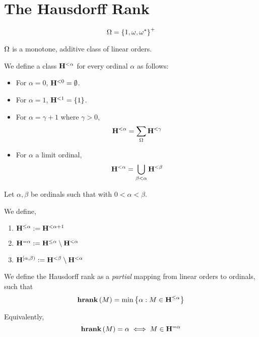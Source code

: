 \section{The Hausdorff Rank}

\begin{definition}
  \[
    \Omega = \left\{ {1, \omega, \omega^\ast} \right\}^+
  \]
\end{definition}

\begin{observation}
  $\Omega$ is a monotone, additive class of linear orders.
\end{observation}

\begin{definition}
  We define a class $\mathbf{H}^{< \alpha}$
  for every ordinal $\alpha$ as follows:

  \begin{itemize}
    \item For $\alpha = 0$, $\mathbf{H}^{< 0} = \emptyset$.
    \item For $\alpha = 1$, $\mathbf{H}^{< 1} = \left\{ {1} \right\}$.
    \item For $\alpha = \gamma + 1$ where $\gamma > 0$,
          \[\mathbf{H}^{< \alpha} = \sum_{\Omega}{\mathbf{H}^{< \gamma}}\]
    \item For $\alpha$ a limit ordinal,
          \[\mathbf{H}^{< \alpha} = \bigcup_{\beta < \alpha} \mathbf{H}^{< \beta}\]
  \end{itemize}

\end{definition}

\begin{definition}
  Let $\alpha, \beta$ be ordinals such that with $0 < \alpha < \beta$.

  We define,
  \begin{enumerate}
    \item $\mathbf{H}^{\le \alpha} := \mathbf{H}^{< \alpha + 1}$
    \item $\mathbf{H}^{= \alpha} := \mathbf{H}^{\le \alpha} \setminus \mathbf{H}^{< \alpha}$
    \item $\mathbf{H}^{[\alpha, \beta)} := \mathbf{H}^{< \beta} \setminus \mathbf{H}^{< \alpha}$
  \end{enumerate}
\end{definition}

\begin{definition}
  We define the Hausdorff rank as a \emph{partial} mapping
  from linear orders to ordinals, such that
  \[
    \mathbf{hrank} \left( {M} \right) = \min \left\{ {\alpha : M \in \mathbf{H}^{\le \alpha}} \right\}
  \]

  Equivalently, \[
    \mathbf{hrank} \left( {M} \right) = \alpha \iff M \in \mathbf{H}^{= \alpha}
  \]

\end{definition}


